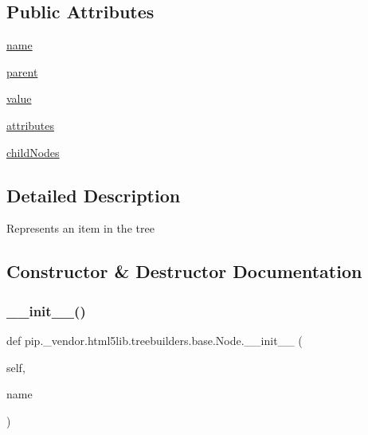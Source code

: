 \subsection*{Public Attributes}
\begin{DoxyCompactItemize}
\item 
\hyperlink{classpip_1_1__vendor_1_1html5lib_1_1treebuilders_1_1base_1_1Node_aaf5f466807c04fcc29523ace66986cb0}{name}
\item 
\hyperlink{classpip_1_1__vendor_1_1html5lib_1_1treebuilders_1_1base_1_1Node_a3c71ff68495bd971cb4751c22dd94f1b}{parent}
\item 
\hyperlink{classpip_1_1__vendor_1_1html5lib_1_1treebuilders_1_1base_1_1Node_a57ce73018ccf43e56ced3dc6041d9af8}{value}
\item 
\hyperlink{classpip_1_1__vendor_1_1html5lib_1_1treebuilders_1_1base_1_1Node_abfa93932f6ea1e46474768753198b060}{attributes}
\item 
\hyperlink{classpip_1_1__vendor_1_1html5lib_1_1treebuilders_1_1base_1_1Node_a52302ddf2f8ea84a7f3a4e419d1e6f64}{child\+Nodes}
\end{DoxyCompactItemize}


\subsection{Detailed Description}
\begin{DoxyVerb}Represents an item in the tree\end{DoxyVerb}
 

\subsection{Constructor \& Destructor Documentation}
\mbox{\label{classpip_1_1__vendor_1_1html5lib_1_1treebuilders_1_1base_1_1Node_a9f688f4137f5f849e309ff56dfb7c307}} 
\subsubsection{\texorpdfstring{\+\_\+\+\_\+init\+\_\+\+\_\+()}{\_\_init\_\_()}}
{\footnotesize\ttfamily def pip.\+\_\+vendor.\+html5lib.\+treebuilders.\+base.\+Node.\+\_\+\+\_\+init\+\_\+\+\_\+ (\begin{DoxyParamCaption}\item[{}]{self,  }\item[{}]{name }\end{DoxyParamCaption})}


